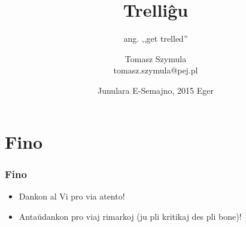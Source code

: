 \documentclass{beamer}
\title{Trelliĝu}
\subtitle{ang. ,,get trelled''}
\author{Tomasz Szymula \\ tomasz.szymula@pej.pl}
\institute[PEJ]{\texttt{[image: bildoj/pej]}}
\date[JES 2015]{Junulara E-Semajno, 2015 Eger}
\begin{document}
  \frame{\titlepage}
 


%










  

\section*{Fino}
  \begin{frame}
    \frametitle{Fino}

	\begin{itemize}
		\item Dankon al Vi pro via atento!
		
		\item Antaŭdankon pro viaj rimarkoj (ju pli kritikaj des pli bone)! 
		
	\end{itemize}		
	
  \end{frame}
\end{document}
